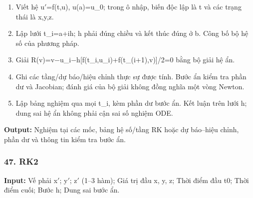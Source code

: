 \begin{enumerate}

\item Viết hệ u\ensuremath{\prime}=\allowbreak{}f(\allowbreak{}t,\allowbreak{}u),\allowbreak{} u(\allowbreak{}a)=\allowbreak{}u\_0;\allowbreak{} trong ô nhập,\allowbreak{} biến độc lập là t và các trạng thái là x,\allowbreak{}y,\allowbreak{}z.

\item Lập lưới t\_i=\allowbreak{}a+\allowbreak{}ih;\allowbreak{} h phải đúng chiều và kết thúc đúng ở b. Công bố bộ hệ số của phương pháp.

\item Giải R(\allowbreak{}v)=\allowbreak{}v\ensuremath{-}u\_i\ensuremath{-}h[f(\allowbreak{}t\_i,\allowbreak{}u\_i)+\allowbreak{}f(\allowbreak{}t\_(\allowbreak{}i+\allowbreak{}1),\allowbreak{}v)]/\allowbreak{}2=\allowbreak{}0 bằng bộ giải hệ ẩn.

\item Ghi các tầng/\allowbreak{}dự báo/\allowbreak{}hiệu chỉnh thực sự được tính. Bước ẩn kiểm tra phần dư và Jacobian;\allowbreak{} đánh giá của bộ giải không đồng nghĩa một vòng Newton.

\item Lập bảng nghiệm qua mọi t\_i,\allowbreak{} kèm phần dư bước ẩn. Kết luận trên lưới h;\allowbreak{} dung sai hệ ẩn không phải cận sai số nghiệm ODE.

\end{enumerate}

\textbf{Output:} Nghiệm tại các mốc,\allowbreak{} bảng hệ số/\allowbreak{}tầng RK hoặc dự báo–hiệu chỉnh,\allowbreak{} phần dư và thông tin kiểm tra bước ẩn.

\examplebreak\subsubsection*{47. RK2}

\textbf{Input:} Vế phải x\ensuremath{\prime};\allowbreak{} y\ensuremath{\prime};\allowbreak{} z\ensuremath{\prime} (\allowbreak{}1–3 hàm);\allowbreak{} Giá trị đầu x,\allowbreak{} y,\allowbreak{} z;\allowbreak{} Thời điểm đầu t0;\allowbreak{} Thời điểm cuối;\allowbreak{} Bước h;\allowbreak{} Dung sai bước ẩn.

